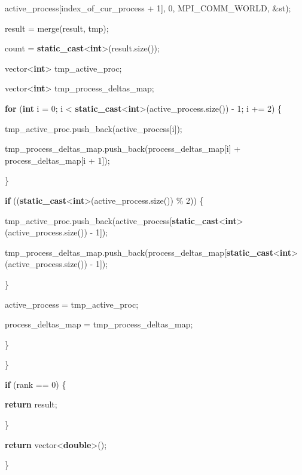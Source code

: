 \documentclass[]{article}
\begin{document}
active\_process{[}index\_of\_cur\_process + 1{]}, 0, MPI\_COMM\_WORLD,
\&st);

result = merge(result, tmp);

count =
\textbf{static\_cast}\textless{}\textbf{int}\textgreater{}(result.size());

vector\textless{}\textbf{int}\textgreater{} tmp\_active\_proc;

vector\textless{}\textbf{int}\textgreater{} tmp\_process\_deltas\_map;

\textbf{for} (\textbf{int} i = 0; i \textless{}
\textbf{static\_cast}\textless{}\textbf{int}\textgreater{}(active\_process.size())
- 1; i += 2) \{

tmp\_active\_proc.push\_back(active\_process{[}i{]});

tmp\_process\_deltas\_map.push\_back(process\_deltas\_map{[}i{]} +
process\_deltas\_map{[}i + 1{]});

\}

\textbf{if}
((\textbf{static\_cast}\textless{}\textbf{int}\textgreater{}(active\_process.size())
\% 2)) \{

tmp\_active\_proc.push\_back(active\_process{[}\textbf{static\_cast}\textless{}\textbf{int}\textgreater{}(active\_process.size())
- 1{]});

tmp\_process\_deltas\_map.push\_back(process\_deltas\_map{[}\textbf{static\_cast}\textless{}\textbf{int}\textgreater{}(active\_process.size())
- 1{]});

\}

active\_process = tmp\_active\_proc;

process\_deltas\_map = tmp\_process\_deltas\_map;

\}

\}

\textbf{if} (rank == 0) \{

\textbf{return} result;

\}

\textbf{return} vector\textless{}\textbf{double}\textgreater{}();

\}
\end{document}
